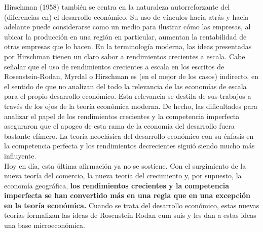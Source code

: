 Hirschman (1958) también se centra en la naturaleza autorreforzante del (diferencias en) el desarrollo económico. Su uso de vínculos hacia atrás y hacia adelante puede considerarse como un medio para ilustrar cómo las empresas, al ubicar la producción en una región en particular, aumentan la rentabilidad de otras empresas que lo hacen. En la terminología moderna, las ideas presentadas por Hirschman tienen un claro sabor a rendimientos crecientes a escala. Cabe señalar que el uso de rendimientos crecientes a escala en los escritos de Rosenstein-Rodan, Myrdal o Hirschman es (en el mejor de los casos) indirecto, en el sentido de que no analizan del todo la relevancia de las economías de escala para el propio desarrollo económico. Esta relevancia se destila de sus trabajos a través de los ojos de la teoría económica moderna. De hecho, las dificultades para analizar el papel de los rendimientos crecientes y la competencia imperfecta aseguraron que el apogeo de esta rama de la economía del desarrollo fuera bastante efímero. La teoría neoclásica del desarrollo económico con su énfasis en la competencia perfecta y los rendimientos decrecientes siguió siendo mucho más influyente.\\
Hoy en día, esta última afirmación ya no se sostiene. Con el surgimiento de la nueva teoría del comercio, la nueva teoría del crecimiento y, por supuesto, la economía geográfica, \textbf{los rendimientos crecientes y la competencia imperfecta se han convertido más en una regla que en una excepción en la teoría económica.} Cuando se trata del desarrollo económico, estas nuevas teorías formalizan las ideas de Rosenstein Rodan cum suis y les dan a estas ideas una base microeconómica.\\

